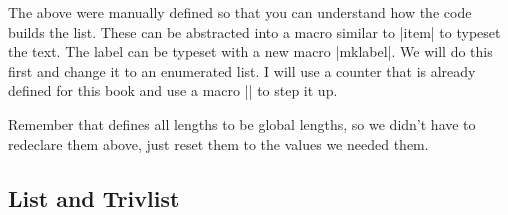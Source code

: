 The above were manually defined so that you can understand how the code builds the list. These can be abstracted into a macro similar to |item| to typeset the text. The label can be typeset with a new macro |mklabel|. We will do this first and change it to an enumerated list. I will use a counter that is already defined for this book and use a macro |\inc| to step it up.


Remember that \latexe defines all lengths to be global lengths, so we didn't have to redeclare them above, just reset them to the values we needed them.


 \subsection{List and Trivlist}

